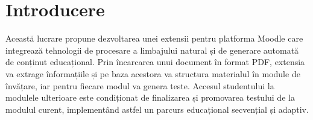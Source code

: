 \chapter*{Introducere} 

Această lucrare propune dezvoltarea unei extensii pentru platforma Moodle care integrează tehnologii de procesare a limbajului natural și de generare automată de conținut educațional. 
Prin încarcarea unui document în format PDF, extensia va extrage înformațiile și pe baza acestora va structura materialul în module de învățare, iar pentru fiecare modul va genera teste. 
Accesul studentului la modulele ulterioare este condiționat de finalizarea și promovarea testului de la modulul curent, implementând astfel un parcurs educațional secvențial și adaptiv.